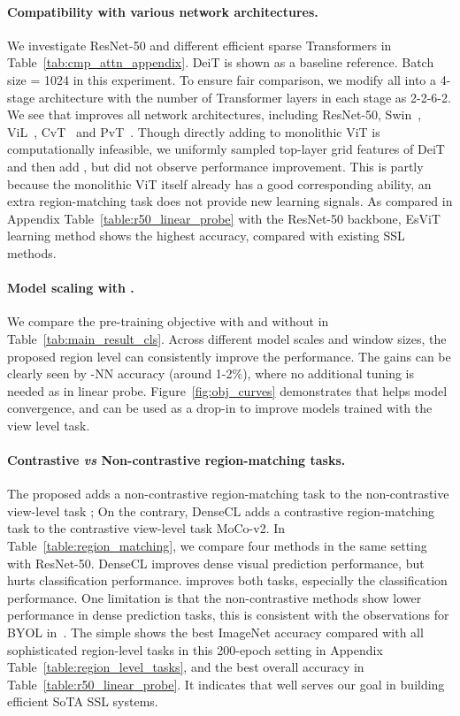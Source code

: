 \documentclass{article} \usepackage{iclr2022_conference,times}
\newcommand{\shortname}{EsViT}
\begin{document}
\paragraph{Compatibility with various network architectures.} We investigate ResNet-50 and different efficient sparse Transformers in Table~\ref{tab:cmp_attn_appendix}. DeiT is shown as a baseline reference. Batch size = 1024 in this experiment. To ensure fair comparison, we modify all into a 4-stage architecture with the number of Transformer layers in each stage as 2-2-6-2. We see that  improves all network architectures, including ResNet-50, Swin~\citep{liu2021Swin}, ViL~\citep{zhang2021vil}, CvT~\citep{wu2021cvt} and PvT~\citep{wang2021pyramid}. 
Though directly adding  to monolithic ViT is computationally infeasible, we uniformly sampled top-layer grid features of DeiT and then add , but did not observe performance improvement. This is partly because the monolithic ViT itself already has a good corresponding ability, an extra region-matching task does not provide new learning signals.  As compared in Appendix Table~\ref{table:r50_linear_probe} with the ResNet-50 backbone, \shortname{} learning method shows the highest accuracy, compared with existing SSL methods.




\paragraph{Model scaling with .} We compare the pre-training objective with and without  in Table~\ref{tab:main_result_cls}. Across different model scales and window sizes, the proposed region level  can consistently improve the performance. The gains can be clearly seen by -NN accuracy (around 1-2\%),  where no additional tuning is needed as in linear probe. Figure~\ref{fig:obj_curves} demonstrates that  helps model convergence, and can be used as a drop-in to improve models trained with the view level task.

\paragraph{Contrastive {\em vs} Non-contrastive region-matching tasks.} The proposed  adds a non-contrastive region-matching task to the non-contrastive view-level task ; On the contrary, DenseCL adds a contrastive region-matching task to the contrastive view-level task MoCo-v2. In Table~\ref{table:region_matching}, we compare four methods in the same setting with ResNet-50. DenseCL improves dense visual prediction performance, but hurts classification performance.  improves both tasks, especially the classification performance. One limitation is that the non-contrastive methods show lower performance in dense prediction tasks, this is consistent with the observations for BYOL in~\citep{wang2020dense}.
The simple  shows the best ImageNet accuracy compared with all sophisticated region-level tasks in this 200-epoch setting in Appendix Table~\ref{table:region_level_tasks}, and the best overall accuracy in Table~\ref{table:r50_linear_probe}. It indicates that  well serves our goal in building efficient SoTA SSL systems.
\end{document}
